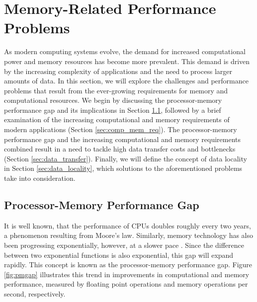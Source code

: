\section{Memory-Related Performance Problems}\label{sec:background}


As modern computing systems evolve, the demand for increased computational power and memory resources has become more prevalent. This demand is driven by the increasing complexity of applications and the need to process larger amounts of data. In this section, we will explore the challenges and performance problems that result from the ever-growing requirements for memory and computational resources. We begin by discussing the processor-memory performance gap and its implications in Section \ref{sec:pmgap}, followed by a brief examination of the increasing computational and memory requirements of modern applications (Section \ref{sec:comp_mem_req}). The processor-memory performance gap and the increasing computational and memory requirements combined result in a need to tackle high data transfer costs and bottlenecks (Section \ref{sec:data_transfer}). Finally, we will define the concept of data locality in Section \ref{sec:data_locality}, which solutions to the aforementioned problems take into consideration.

\subsection{Processor-Memory Performance Gap}\label{sec:pmgap}
It is well known, that the performance of CPUs doubles roughly every two years, a phenomenon resulting from Moore's law. Similarly, memory technology has also been progressing exponentially, however, at a slower pace \cite{efnusheva2017survey, machanick2002approaches, mckee2004reflections, mccalpin1997survey}. Since the difference between two exponential functions is also exponential, this gap will expand rapidly. This concept is known as the processor-memory performance gap. Figure \ref{fig:pmgap} illustrates this trend in improvements in computational and memory performance, measured by floating point operations and memory operations per second, respectively.

